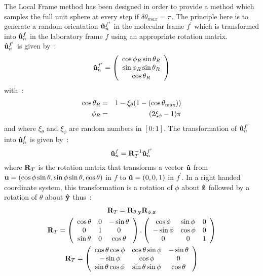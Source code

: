 The Local Frame method has been designed in order to provide a method which samples the full
unit sphere at every step if $\delta\theta_{max} =\pi$. The principle here is to generate a random
orientation $\mathbf{\hat{u} }_n^{f^\prime}$ in the molecular frame $f^{\prime}$ which is transformed into $\mathbf{\hat{u} }_n^{f}$ in the
laboratory frame $f$ using an appropriate rotation matrix.\\
$\mathbf{\hat{u} }_n^{f^\prime}$ is given by~:
\begin{equation}
	\mathbf{\hat{u} }_n^{f^\prime} = \left(
	\begin{array}{ccc}
		\cos\phi_R\sin\theta_R	\\
		\sin\phi_R\sin\theta_R	\\
		\cos\theta_R
	\end{array}\right)
\end{equation}
with~:
\begin{eqnarray}
	\cos\theta_R 	&=& 1-\xi_\theta( 1-(\cos\theta_{\mathrm{max}} ))	\\
	\phi_R		&=& (2\xi_\phi -1)\pi
\end{eqnarray}
%
and where $\xi_\theta$ and $\xi_\phi$ are random numbers in $[0:1]$. The transformation of 
$\mathbf{\hat{u} }_n^{f^\prime}$ into $\mathbf{\hat{u} }_n^{f}$ is given by~:
\begin{equation}
	\mathbf{\hat{u} }_n^{f} = \mathbf{R}^{-1}_T\mathbf{\hat{u} }_n^{f^\prime}
\end{equation}
%
where $\mathbf{R}_T$ is the rotation matrix that transforms a vector $\mathbf{\hat{u} }$ from
$\mathbf{u}=(\cos\phi\sin\theta,\- \sin\phi\sin\theta,\- \cos\theta)$ in $f$
to $\mathbf{\hat{u} } = (0, 0, 1)$ in $f^\prime$. In a right handed coordinate system,
this transformation is a 
rotation of $\phi$ about $\mathbf{\hat{z} }$ followed by a rotation of $\theta$ about $\mathbf{\hat{y} }$ thus~:
%
\begin{gather}
	\mathbf{R}_T = \mathbf{R_{\theta,y}}\mathbf{R_{\phi,z}}	\\
	\mathbf{R}_T = \left(
		\begin{array}{ccc}
		\cos\theta	&0	&-\sin\theta	\\
                0		&1	&0		\\
                \sin\theta	&0	&\cos\theta
		\end{array}\right)
	.\left(
		\begin{array}{ccc}
		\cos\phi	&\sin\phi	&0	\\
                -\sin\phi	&\cos\phi	&0	\\
                0		&0		&1
                \end{array}\right)	\\
        \mathbf{R}_T = \left(
		\begin{array}{ccc}
			\cos\theta\cos\phi	&\cos\theta\sin\phi	&-\sin\theta	\\
                        -\sin\phi		&\cos\phi		&0		\\
                        \sin\theta\cos\phi	&\sin\theta\sin\phi	&\cos\theta
                \end{array}
        \right)
\end{gather}

